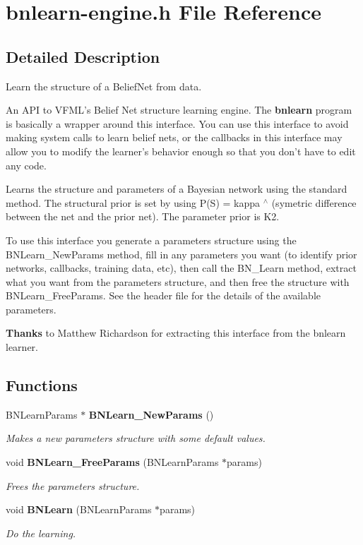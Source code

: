 \section{bnlearn-engine.h File Reference}
\label{bnlearn-engine_8h}


\subsection{Detailed Description}
Learn the structure of a Belief\-Net from data. 

An API to VFML's Belief Net structure learning engine. The {\bf bnlearn} program is basically a wrapper around this interface. You can use this interface to avoid making system calls to learn belief nets, or the callbacks in this interface may allow you to modify the learner's behavior enough so that you don't have to edit any code.

Learns the structure and parameters of a Bayesian network using the standard method. The structural prior is set by using P(S) = kappa $^\wedge$ (symetric difference between the net and the prior net). The parameter prior is K2.

To use this interface you generate a parameters structure using the BNLearn\_\-New\-Params method, fill in any parameters you want (to identify prior networks, callbacks, training data, etc), then call the BN\_\-Learn method, extract what you want from the parameters structure, and then free the structure with BNLearn\_\-Free\-Params. See the header file for the details of the available parameters.

\begin{Desc}
\item[{\bf Thanks}]to Matthew Richardson for extracting this interface from the bnlearn learner. \end{Desc}


\subsection*{Functions}
\begin{CompactItemize}
\item 
BNLearn\-Params $\ast$ {\bf BNLearn\_\-New\-Params} ()
\begin{CompactList}\small\item\em Makes a new parameters structure with some default values. \item\end{CompactList}\item 
void {\bf BNLearn\_\-Free\-Params} (BNLearn\-Params $\ast$params)
\begin{CompactList}\small\item\em Frees the parameters structure. \item\end{CompactList}\item 
void {\bf BNLearn} (BNLearn\-Params $\ast$params)
\begin{CompactList}\small\item\em Do the learning. \item\end{CompactList}\end{CompactItemize}


